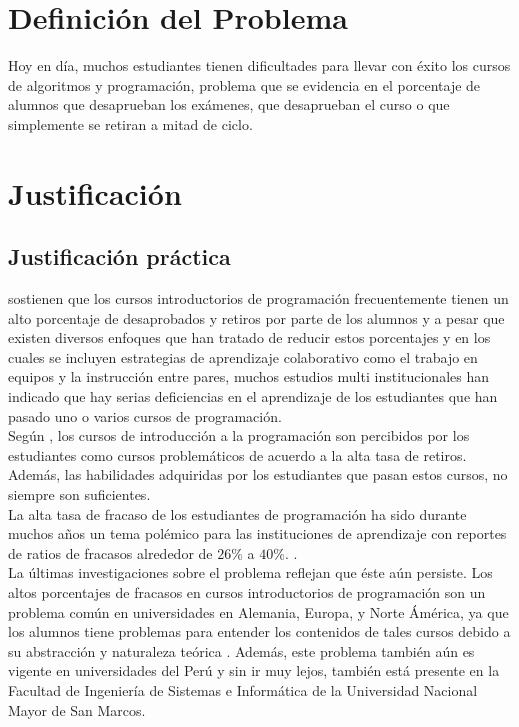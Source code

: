 \section{Definición del Problema}
 Hoy en día, muchos estudiantes tienen dificultades para llevar con éxito los cursos de algoritmos y programación, problema que se evidencia en el porcentaje de alumnos que desaprueban los exámenes, que desaprueban el curso o que simplemente se retiran a mitad de ciclo.

\section{Justificación}
\subsection{Justificación práctica}
 sostienen que los cursos introductorios de programación frecuentemente tienen un alto porcentaje de desaprobados y retiros por parte de los alumnos y a pesar que existen diversos enfoques que han tratado de reducir estos porcentajes y en los cuales se incluyen estrategias de aprendizaje colaborativo como el trabajo en equipos y la instrucción entre pares, muchos estudios multi institucionales \cite{mccracken_multi-national_2001,lister_multi-national_2004,Tenenberg_studentsdesigning_2005} han indicado que hay serias deficiencias en el aprendizaje de los estudiantes que han pasado uno o varios cursos de programación.\\

Según , los cursos de introducción a la programación son percibidos por los estudiantes como cursos problemáticos de acuerdo a la alta tasa de retiros. Además, las habilidades adquiridas por los estudiantes que pasan estos cursos, no siempre son suficientes.\\

La alta tasa de fracaso de los estudiantes de programación ha sido durante muchos años un tema polémico para las instituciones de aprendizaje con reportes de ratios de fracasos alrededor de $26\%$ a $40\%$. \cite{sheard_our_1998,truong_web_2003,lang_seven_2007,han_enhancement_2010}.\\

La últimas investigaciones sobre el problema reflejan que éste aún persiste. Los altos porcentajes de fracasos en cursos introductorios de programación son un problema común en universidades en Alemania, Europa, y Norte Ámérica, ya que los alumnos tiene problemas para entender los contenidos de tales cursos debido a su abstracción y naturaleza teórica \cite{knobelsdorf_teaching_2014}. Además, este problema también aún es vigente en universidades del Perú y sin ir muy lejos, también está presente en la Facultad de Ingeniería de Sistemas e Informática de la Universidad Nacional Mayor de San Marcos.


